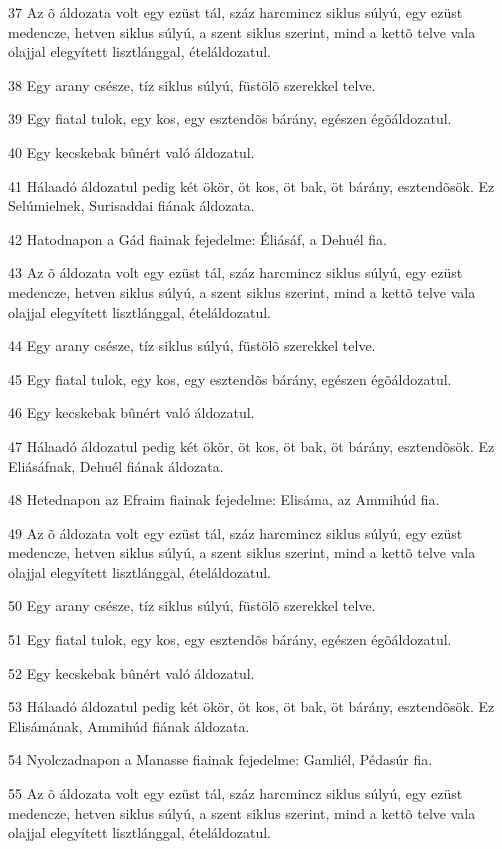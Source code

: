 \par 37 Az õ áldozata volt egy ezüst tál, száz harcmincz siklus súlyú, egy ezüst medencze, hetven siklus súlyú, a szent siklus szerint, mind a kettõ telve vala olajjal elegyített lisztlánggal, ételáldozatul.
\par 38 Egy arany csésze, tíz siklus súlyú, füstölõ szerekkel telve.
\par 39 Egy fiatal tulok, egy kos, egy esztendõs bárány, egészen égõáldozatul.
\par 40 Egy kecskebak bûnért való áldozatul.
\par 41 Hálaadó áldozatul pedig két ökör, öt kos, öt bak, öt bárány, esztendõsök. Ez Selúmielnek, Surisaddai fiának áldozata.
\par 42 Hatodnapon a Gád fiainak fejedelme: Éliásáf, a Dehuél fia.
\par 43 Az õ áldozata volt egy ezüst tál, száz harcmincz siklus súlyú, egy ezüst medencze, hetven siklus súlyú, a szent siklus szerint, mind a kettõ telve vala olajjal elegyített lisztlánggal, ételáldozatul.
\par 44 Egy arany csésze, tíz siklus súlyú, füstölõ szerekkel telve.
\par 45 Egy fiatal tulok, egy kos, egy esztendõs bárány, egészen égõáldozatul.
\par 46 Egy kecskebak bûnért való áldozatul.
\par 47 Hálaadó áldozatul pedig két ökör, öt kos, öt bak, öt bárány, esztendõsök. Ez Eliásáfnak, Dehuél fiának áldozata.
\par 48 Hetednapon az Efraim fiainak fejedelme: Elisáma, az Ammihúd fia.
\par 49 Az õ áldozata volt egy ezüst tál, száz harcmincz siklus súlyú, egy ezüst medencze, hetven siklus súlyú, a szent siklus szerint, mind a kettõ telve vala olajjal elegyített lisztlánggal, ételáldozatul.
\par 50 Egy arany csésze, tíz siklus súlyú, füstölõ szerekkel telve.
\par 51 Egy fiatal tulok, egy kos, egy esztendõs bárány, egészen égõáldozatul.
\par 52 Egy kecskebak bûnért való áldozatul.
\par 53 Hálaadó áldozatul pedig két ökör, öt kos, öt bak, öt bárány, esztendõsök. Ez Elisámának, Ammihúd fiának áldozata.
\par 54 Nyolczadnapon a Manasse fiainak fejedelme: Gamliél, Pédasúr fia.
\par 55 Az õ áldozata volt egy ezüst tál, száz harcmincz siklus súlyú, egy ezüst medencze, hetven siklus súlyú, a szent siklus szerint, mind a kettõ telve vala olajjal elegyített lisztlánggal, ételáldozatul.
